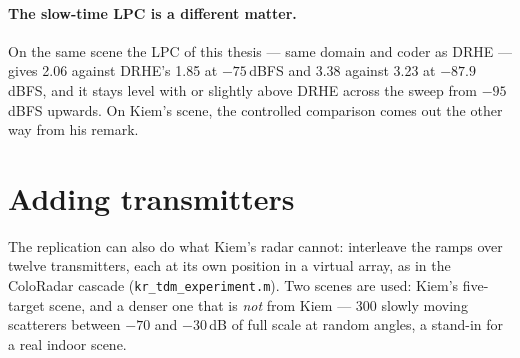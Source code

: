 \paragraph{The slow-time LPC is a different matter.} On the same scene the LPC
of this thesis --- same domain and coder as DRHE --- gives 2.06 against DRHE's
1.85 at $-75$\,dBFS and 3.38 against 3.23 at $-87.9$\,dBFS, and it stays level
with or slightly above DRHE across the sweep from $-95$\,dBFS upwards. On
Kiem's scene, the controlled comparison comes out the other way from his
remark.

\section{Adding transmitters}
\label{sec:kr_tdm}

The replication can also do what Kiem's radar cannot: interleave the ramps
over twelve transmitters, each at its own position in a virtual array, as in
the ColoRadar cascade (\texttt{kr\_tdm\_experiment.m}). Two scenes are used:
Kiem's five-target scene, and a denser one that is \emph{not} from Kiem --- 300
slowly moving scatterers between $-70$ and $-30$\,dB of full scale at random
angles, a stand-in for a real indoor scene.

